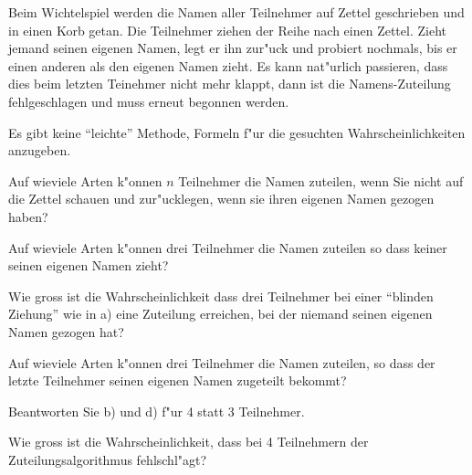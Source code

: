 Beim Wichtelspiel werden die Namen aller Teilnehmer auf Zettel geschrieben
und in einen Korb getan.
Die Teilnehmer ziehen der Reihe nach einen Zettel.
Zieht jemand seinen eigenen Namen, legt er ihn zur"uck und probiert
nochmals, bis er einen anderen als den eigenen Namen zieht.
Es kann nat"urlich passieren, dass dies beim letzten Teinehmer
nicht mehr klappt, dann ist die Namens-Zuteilung fehlgeschlagen und
muss erneut begonnen werden.

\begin{hinweis}
Es gibt keine ``leichte'' Methode, Formeln f"ur die gesuchten
Wahrscheinlichkeiten anzugeben.
\end{hinweis}

\begin{teilaufgaben}
\item Auf wieviele Arten k"onnen $n$ Teilnehmer die Namen zuteilen,
wenn Sie nicht auf die Zettel schauen und zur"ucklegen, wenn sie ihren
eigenen Namen gezogen haben?
\item Auf wieviele Arten k"onnen drei Teilnehmer die Namen zuteilen
so dass keiner seinen eigenen Namen zieht?
\item Wie gross ist die Wahrscheinlichkeit dass drei Teilnehmer
bei einer ``blinden Ziehung'' wie in a) eine Zuteilung erreichen, bei
der niemand seinen eigenen Namen gezogen hat?
\item Auf wieviele Arten k"onnen drei Teilnehmer die Namen zuteilen,
so dass der letzte Teilnehmer seinen eigenen Namen zugeteilt bekommt?
\item Beantworten Sie b) und d) f"ur 4 statt 3 Teilnehmer.
\item Wie gross ist die Wahrscheinlichkeit, dass bei 4 Teilnehmern
der Zuteilungsalgorithmus fehlschl"agt?
\end{teilaufgaben}

